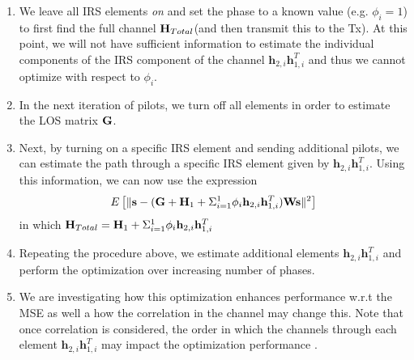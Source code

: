 \documentclass[12pt,a4paper]{report}
\begin{document}
\begin{enumerate}
\item
We leave all IRS elements \emph{on} and set the phase to a known value (e.g. $\phi_i = 1 $) to first find the full channel   $\mathbf{H}_{Total}$(and then transmit this to the Tx). At this point, we will not have sufficient information to estimate the individual components of the IRS component of the channel $\mathbf{h}_{2,i}\mathbf{h}^T_{1,i}$ and thus we cannot optimize with respect to $\phi_i $.
\item
	In the next iteration of pilots, we turn off all elements in order to estimate the LOS matrix $\mathbf{G} $.
\item
	Next, by turning on a specific IRS element and sending additional pilots, we can estimate 
	the path through a specific IRS element given by $\mathbf{h}_{2,i}\mathbf{h}^T_{1,i}$.
	Using this information, we can now use the expression 
	\begin{equation}
E\left[\|  \mathbf{s} - (\mathbf{G} +  \mathbf{H}_1 + \Sigma_{i=1}^{1} \phi_i \mathbf{h}_{2,i}\mathbf{h}^T_{1,i})\mathbf{W}\mathbf{s}  \|^2 \right]
\end{equation}
in which $\mathbf{H}_{Total} =  \mathbf{H}_1 + \Sigma_{i=1}^{1} \phi_i \mathbf{h}_{2,i}\mathbf{h}^T_{1,i}$
	\item
		Repeating the procedure above, we estimate additional elements $\mathbf{h}_{2,i}\mathbf{h}^T_{1,i}$ and perform the optimization over increasing number of phases.
	\item 
		We are investigating how this optimization enhances performance w.r.t the MSE as well a how the correlation in the channel may change this. 
		Note that once correlation is considered, the order in which the channels through each element $\mathbf{h}_{2,i}\mathbf{h}^T_{1,i}$ may impact the optimization performance .
\end{enumerate}
\end{document}
